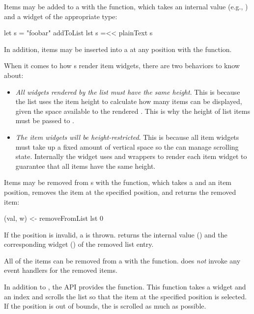 Items may be added to a  with the  function,
which takes an internal value (e.g., ) and a widget of the
appropriate type:

\begin{haskellcode}
 let s = "foobar"
 addToList lst s =<< plainText s
\end{haskellcode}

In addition, items may be inserted into a  at any position with
the  function.

When it comes to how s render item widgets, there are two behaviors to
know about:

\begin{itemize}
\item \textit{All widgets rendered by the list must have the same height}.
  This is because the list uses the item height to calculate how many
  items can be displayed, given the space available to the rendered .
  This is why the height of list items must be passed to .
\item \textit{The item widgets will be height-restricted}.  This is because all
   item widgets must take up a fixed amount of vertical space so the
   can manage scrolling state.  Internally the  widget uses
   and  wrappers to render each item widget to guarantee
  that all items have the same height.
\end{itemize}

Items may be removed from s with the 
function, which takes a  and an item position,
removes the item at the specified position, and returns the removed
item:

\begin{haskellcode}
 (val, w) <- removeFromList lst 0
\end{haskellcode}

If the position is invalid, a  is thrown.
 returns the internal value () and the
corresponding widget () of the removed list entry.

All of the items can be removed from a  with the
 function.   does \textit{not} invoke any
event handlers for the removed items.

In addition to , the  API provides the
 function.  This function takes a  widget and
an index and scrolls the list so that the item at the specified
position is selected.  If the position is out of bounds, the 
is scrolled as much as possible.

